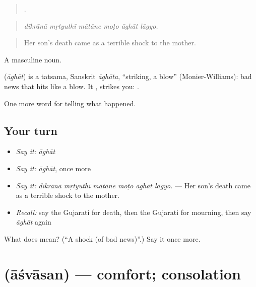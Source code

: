 \begin{quote}
     .
\end{quote}

\begin{quote}
\emph{dīkrānā mṛtyuthī mātāne moṭo āghāt lāgyo.}
\end{quote}

\begin{quote}
Her son's death came as a terrible shock to the mother.
\end{quote}

A masculine noun.

\begin{cousinweb}
\textbf{} (\emph{āghāt}) is a tatsama, Sanskrit \emph{āghāta}, \textquotedblleft{}striking, a blow\textquotedblright{} (Monier-Williams): bad news that hits like a blow. It \textbf{ }, strikes you: \textbf{  }.
\end{cousinweb}

\begin{grammarlens}[title={What you've built}]
One more word for telling what happened.
\end{grammarlens}

\subsection*{Your turn}
\begin{itemize}
\raggedright
  \item \emph{Say it:} \emph{āghāt}
  \item \emph{Say it:} \emph{āghāt}, once more
  \item \emph{Say it:} \emph{dīkrānā mṛtyuthī mātāne moṭo āghāt lāgyo.} — Her son's death came as a terrible shock to the mother.
  \item \emph{Recall:} say the Gujarati for death, then the Gujarati for mourning, then say \emph{āghāt} again
\end{itemize}

\begin{tcolorbox}[breakable,colback=teal!4,colframe=teal!35!black,title={Before you move on}]
What does  mean? (\textquotedblleft{}A shock (of bad news)\textquotedblright{}.) Say it once more.
\end{tcolorbox}
\section[\texorpdfstring{\gu{આશ્વાસન} (āśvāsan)}{આશ્વાસન (āśvāsan)}]{ (āśvāsan) — comfort; consolation}


